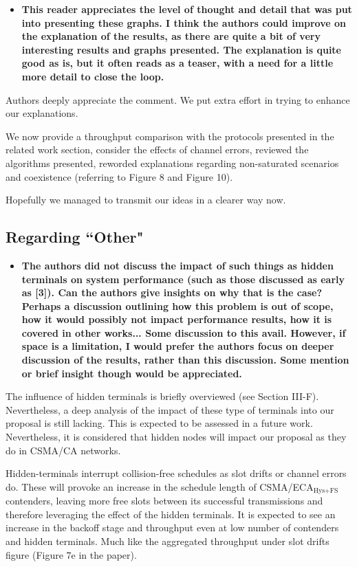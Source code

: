 \documentclass[]{article}
\begin{document}
		\begin{itemize}
			\item {\bfseries This reader appreciates the level of thought and detail that was put into presenting these graphs. I think the authors could improve on the explanation of the results, as there are quite a bit of very interesting results and graphs presented. The explanation is quite good as is, but it often reads as a teaser, with a need for a little more detail to close the loop.}
		\end{itemize}
		
		Authors deeply appreciate the comment. We put extra effort in trying to enhance our explanations. 
		
		We now provide a throughput comparison with the protocols presented in the related work section, consider the effects of channel errors, reviewed the algorithms presented, reworded explanations regarding non-saturated scenarios and coexistence (referring to Figure 8 and Figure 10).
		
		Hopefully we managed to transmit our ideas in a clearer way now. 
		
	\subsection{Regarding ``Other"}
		\begin{itemize}
			\item {\bf The authors did not discuss the impact of such things as hidden terminals on system performance (such as those discussed as early as [3]). Can the authors give insights on why that is the case? Perhaps a discussion outlining how this problem is out of scope, how it would possibly not impact performance results, how it is covered in other works... Some discussion to this avail. However, if space is a limitation, I would prefer the authors focus on deeper discussion of the results, rather than this discussion. Some mention or brief insight though would be appreciated.}
		\end{itemize}
	
		The influence of hidden terminals is briefly overviewed (see Section III-F). Nevertheless, a deep analysis of the impact of these type of terminals into our proposal is still lacking. This is expected to be assessed in a future work. Nevertheless, it is considered that hidden nodes will impact our proposal as they do in CSMA/CA networks.
		
		Hidden-terminals interrupt collision-free schedules as slot drifts or channel errors do. These will provoke an increase in the schedule length of CSMA/ECA$_{\text{Hys+FS}}$ contenders, leaving more free slots between its successful transmissions and therefore leveraging the effect of the hidden terminals. It is expected to see an increase in the backoff stage and throughput even at low number of contenders and hidden terminals. Much like the aggregated throughput under slot drifts figure (Figure 7e in the paper).
		
\end{document}
